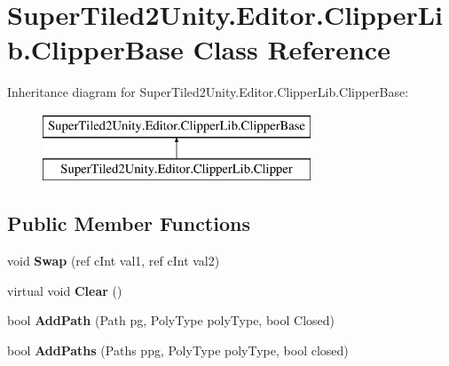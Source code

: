 \hypertarget{class_super_tiled2_unity_1_1_editor_1_1_clipper_lib_1_1_clipper_base}{}\section{Super\+Tiled2\+Unity.\+Editor.\+Clipper\+Lib.\+Clipper\+Base Class Reference}
\label{class_super_tiled2_unity_1_1_editor_1_1_clipper_lib_1_1_clipper_base}
Inheritance diagram for Super\+Tiled2\+Unity.\+Editor.\+Clipper\+Lib.\+Clipper\+Base\+:\begin{figure}[H]
\begin{center}
\leavevmode
\includegraphics[height=2.000000cm]{class_super_tiled2_unity_1_1_editor_1_1_clipper_lib_1_1_clipper_base}
\end{center}
\end{figure}
\subsection*{Public Member Functions}
\begin{DoxyCompactItemize}
\item 
\mbox{\label{class_super_tiled2_unity_1_1_editor_1_1_clipper_lib_1_1_clipper_base_a2572bda7aa2d94fc4ec19e6c9d74c567}} 
void {\bfseries Swap} (ref c\+Int val1, ref c\+Int val2)
\item 
\mbox{\label{class_super_tiled2_unity_1_1_editor_1_1_clipper_lib_1_1_clipper_base_ac6504e233b40443324b4fa87a7a482a7}} 
virtual void {\bfseries Clear} ()
\item 
\mbox{\label{class_super_tiled2_unity_1_1_editor_1_1_clipper_lib_1_1_clipper_base_a1a6c0dd8573073e72476ce1f22c01015}} 
bool {\bfseries Add\+Path} (Path pg, Poly\+Type poly\+Type, bool Closed)
\item 
\mbox{\label{class_super_tiled2_unity_1_1_editor_1_1_clipper_lib_1_1_clipper_base_a9ccedcbaffa454b07dc9e7ff870f833a}} 
bool {\bfseries Add\+Paths} (Paths ppg, Poly\+Type poly\+Type, bool closed)
\end{DoxyCompactItemize}
